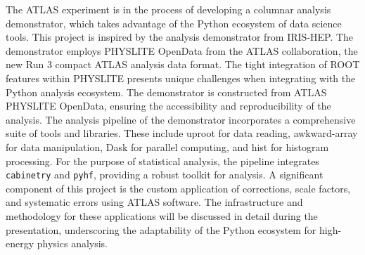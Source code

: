 The ATLAS experiment is in the process of developing a columnar analysis demonstrator, which takes advantage of the Python ecosystem of data science tools.
This project is inspired by the analysis demonstrator from IRIS-HEP.
The demonstrator employs PHYSLITE OpenData from the ATLAS collaboration, the new Run 3 compact ATLAS analysis data format.
The tight integration of ROOT features within PHYSLITE presents unique challenges when integrating with the Python analysis ecosystem.
The demonstrator is constructed from ATLAS PHYSLITE OpenData, ensuring the accessibility and reproducibility of the analysis.
The analysis pipeline of the demonstrator incorporates a comprehensive suite of tools and libraries.
These include uproot for data reading, awkward-array for data manipulation, Dask for parallel computing, and hist for histogram processing.
For the purpose of statistical analysis, the pipeline integrates \texttt{cabinetry} and \texttt{pyhf}, providing a robust toolkit for analysis.
A significant component of this project is the custom application of corrections, scale factors, and systematic errors using ATLAS software.
The infrastructure and methodology for these applications will be discussed in detail during the presentation, underscoring the adaptability of the Python ecosystem for high-energy physics analysis.
